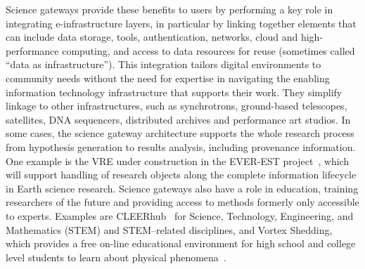 \documentclass[review]{elsarticle}
\begin{document}
Science gateways provide these benefits to users by performing a key role in integrating e-infrastructure layers, in particular by linking together elements that can include data storage, tools, authentication, networks, cloud and high-performance computing, and access to data resources for reuse (sometimes called ``data as infrastructure''). This integration tailors digital environments to community needs without the need for expertise in navigating the enabling information technology infrastructure that supports their work. They simplify linkage to other infrastructures, such as synchrotrons, ground-based telescopes, satellites, DNA sequencers, distributed archives and performance art studios. In some cases, the science gateway architecture supports the whole research process from hypothesis generation to results analysis, including provenance information. One example is the VRE under construction in the EVER-EST project~\cite{everest-73}, which will support handling of research objects along the complete information lifecycle in Earth science research. 
Science gateways also have a role in education, training researchers of the future and providing access to methods formerly only accessible to experts. Examples are CLEERhub~\cite{cleerhub-74} for Science, Technology, Engineering, and Mathematics (STEM) and STEM–related disciplines, and Vortex Shedding, which provides a free on-line educational environment for high school and college level students to learn about physical phenomena~\cite{vortex-75}.
\end{document}
